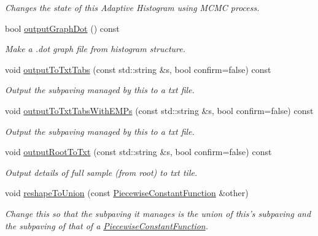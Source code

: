 \begin{DoxyCompactItemize}
\begin{DoxyCompactList}\small\item\em \-Changes the state of this \-Adaptive \-Histogram using \-M\-C\-M\-C process. \end{DoxyCompactList}\item 
bool \hyperlink{classsubpavings_1_1AdaptiveHistogram_a845c591145a1abc86d7d0e1d33c26e22}{output\-Graph\-Dot} () const 
\begin{DoxyCompactList}\small\item\em \-Make a .dot graph file from histogram structure. \end{DoxyCompactList}\item 
void \hyperlink{classsubpavings_1_1AdaptiveHistogram_a49a8ff01e1398420cd45642d5b1d3106}{output\-To\-Txt\-Tabs} (const std\-::string \&s, bool confirm=false) const 
\begin{DoxyCompactList}\small\item\em \-Output the subpaving managed by this to a txt file. \end{DoxyCompactList}\item 
void \hyperlink{classsubpavings_1_1AdaptiveHistogram_a2fb89e060574b8c935191cd3afd91290}{output\-To\-Txt\-Tabs\-With\-E\-M\-Ps} (const std\-::string \&s, bool confirm=false) const 
\begin{DoxyCompactList}\small\item\em \-Output the subpaving managed by this to a txt file. \end{DoxyCompactList}\item 
void \hyperlink{classsubpavings_1_1AdaptiveHistogram_a35416eefb965755a846e1bb64c882439}{output\-Root\-To\-Txt} (const std\-::string \&s, bool confirm=false) const 
\begin{DoxyCompactList}\small\item\em \-Output details of full sample (from root) to txt tile. \end{DoxyCompactList}\item 
void \hyperlink{classsubpavings_1_1AdaptiveHistogram_a1cb13fa570de75efab3b9c4b862d200e}{reshape\-To\-Union} (const \hyperlink{classsubpavings_1_1PiecewiseConstantFunction}{\-Piecewise\-Constant\-Function} \&other)
\begin{DoxyCompactList}\small\item\em \-Change this so that the subpaving it manages is the union of this's subpaving and the subpaving of that of a \hyperlink{classsubpavings_1_1PiecewiseConstantFunction}{\-Piecewise\-Constant\-Function}. \end{DoxyCompactList}\item 

\end{DoxyCompactItemize}
